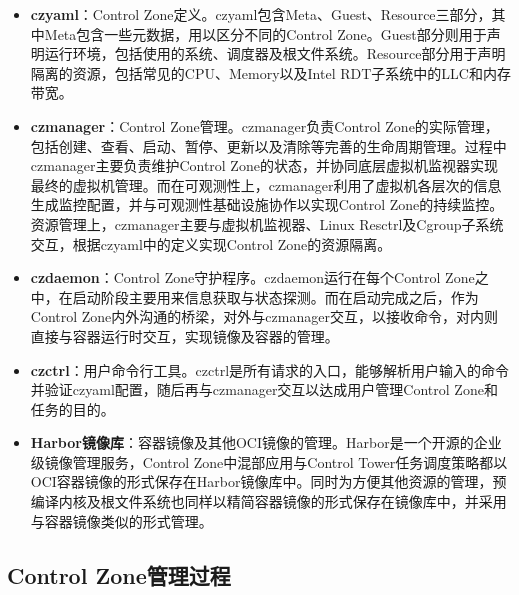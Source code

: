 \begin{itemize}

    \item \textbf{czyaml}：Control Zone定义。czyaml包含Meta、Guest、Resource三部分，其中Meta包含一些元数据，用以区分不同的Control Zone。Guest部分则用于声明运行环境，包括使用的系统、调度器及根文件系统。Resource部分用于声明隔离的资源，包括常见的CPU、Memory以及Intel RDT子系统中的LLC和内存带宽。

    \item \textbf{czmanager}：Control Zone管理。czmanager负责Control Zone的实际管理， 包括创建、查看、启动、暂停、更新以及清除等完善的生命周期管理。过程中czmanager主要负责维护Control Zone的状态，并协同底层虚拟机监视器实现最终的虚拟机管理。而在可观测性上，czmanager利用了虚拟机各层次的信息生成监控配置，并与可观测性基础设施协作以实现Control Zone的持续监控。资源管理上，czmanager主要与虚拟机监视器、Linux Resctrl及Cgroup子系统交互，根据czyaml中的定义实现Control Zone的资源隔离。

    \item \textbf{czdaemon}：Control Zone守护程序。czdaemon运行在每个Control Zone之中，在启动阶段主要用来信息获取与状态探测。而在启动完成之后，作为Control Zone内外沟通的桥梁，对外与czmanager交互，以接收命令，对内则直接与容器运行时交互，实现镜像及容器的管理。

    \item \textbf{czctrl}：用户命令行工具。czctrl是所有请求的入口，能够解析用户输入的命令并验证czyaml配置，随后再与czmanager交互以达成用户管理Control Zone和任务的目的。

    \item \textbf{Harbor镜像库}：容器镜像及其他OCI镜像的管理。Harbor是一个开源的企业级镜像管理服务，Control Zone中混部应用与Control Tower任务调度策略都以OCI容器镜像的形式保存在Harbor镜像库中。同时为方便其他资源的管理，预编译内核及根文件系统也同样以精简容器镜像的形式保存在镜像库中，并采用与容器镜像类似的形式管理。

\end{itemize}

\subsection{Control Zone管理过程}




